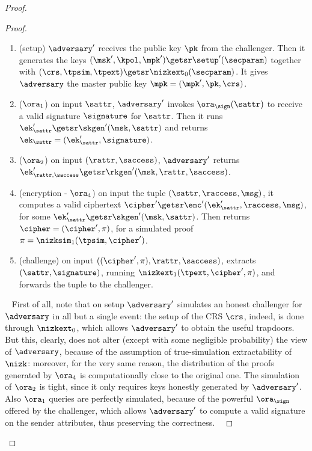 \begin{proof}
\begin{lemma}
\begin{proof}
            \begin{enumerate}
                \item (setup) $\adversary'$ receives the public key $\pk$ from the challenger. Then it generates the keys $(\msk', \kpol, \mpk') \getsr \setup'(\secparam)$ together with $(\crs,\tpsim,\tpext)\getsr\nizkext_0(\secparam)$. It gives $\adversary$ the master public key $\mpk = (\mpk', \pk, \crs)$.
                \item ($\ora_1$) on input $\sattr$, $\adversary'$ invokes $\ora_\sign(\sattr)$ to receive a valid signature $\signature$ for $\sattr$. Then it runs $\ek'_\sattr \getsr \skgen'(\msk, \sattr)$ and returns $\ek_\sattr = (\ek_\sattr', \signature)$.
                \item ($\ora_2$) on input $(\rattr, \saccess)$, $\adversary'$ returns $\ek'_{\rattr, \saccess} \getsr \rkgen'(\msk, \rattr, \saccess)$.
                \item (encryption - $\ora_4$) on input the tuple $(\sattr, \raccess, \msg)$, it computes a valid ciphertext $\cipher' \getsr \enc'(\ek'_\sattr, \raccess, \msg)$, for some $\ek'_\sattr \getsr \skgen'(\msk, \sattr)$. Then returns $\cipher = (\cipher', \pi)$, for a simulated proof $\pi = \nizksim_1(\tpsim, \cipher')$.
                \item (challenge) on input $((\cipher', \pi), \rattr, \saccess)$, extracts $(\sattr, \signature)$, running $\nizkext_1(\tpext, \cipher', \pi)$, and forwards the tuple to the challenger.
            \end{enumerate}
            ~\newline
            First of all, note that on setup $\adversary'$ simulates an honest challenger for $\adversary$ in all but a single event: the setup of the CRS $\crs$, indeed, is done through $\nizkext_0$, which allows $\adversary'$ to obtain the useful trapdoors. But this, clearly, does not alter (except with some negligible probability) the view of $\adversary$, because of the assumption of true-simulation extractability of $\nizk$: moreover, for the very same reason, the distribution of the proofs generated by $\ora_4$ is computationally close to the original one.
            The simulation of $\ora_2$ is tight, since it only requires keys honestly generated by $\adversary'$.
            Also $\ora_1$ queries are perfectly simulated, because of the powerful $\ora_\sign$ offered by the challenger, which allows $\adversary'$ to compute a valid signature on the sender attributes, thus preserving the correctness.
            ~\newline\newline

\end{proof}
\end{lemma}
\end{proof}
